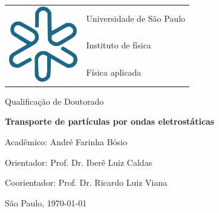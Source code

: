 \documentclass[12pt,a4paper]{article}
\begin{document}
\begin{titlepage}
    \begin{center}
        \begin{tabular}{m{4cm}m{10cm}}
            \multirow{3}{*}{\vspace{-0.5cm}\includegraphics[width=3cm]{if.png}}
            & {\LARGE Universidade de São Paulo} \\
            & {\LARGE Instituto de física} \\
            & {\LARGE Física aplicada} \\
        \end{tabular}
        \vspace{1.8cm}
    
        {\LARGE Qualificação de Doutorado}
        \vspace{4.0cm}

        {\LARGE {\bf Transporte de partículas por ondas eletrostáticas}}
        \vfill

        {\Large Acadêmico: André Farinha Bósio}
        \vspace{0.8cm}
    
        {\Large Orientador: Prof. Dr. Iberê Luiz Caldas}
        \vspace{0.8cm}
        
        {\Large Coorientador: Prof. Dr. Ricardo Luiz Viana}
        \vspace{0.8cm}
        
        
        
        \vspace{1.2cm}
        
        {\large São Paulo, \today}
    \end{center}
\end{titlepage}
\end{document}
